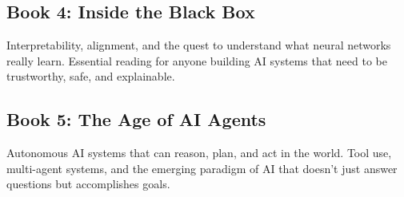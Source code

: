 \documentclass[../main.tex]{subfiles}
\begin{document}
\vspace{0.5cm}

\subsection*{Book 4: Inside the Black Box}

Interpretability, alignment, and the quest to understand what neural networks really learn. Essential reading for anyone building AI systems that need to be trustworthy, safe, and explainable.

\vspace{0.5cm}

\subsection*{Book 5: The Age of AI Agents}

Autonomous AI systems that can reason, plan, and act in the world. Tool use, multi-agent systems, and the emerging paradigm of AI that doesn't just answer questions but accomplishes goals.

\vspace{1cm}

\begin{center}
\end{center}

\cleardoublepage
\end{document}
